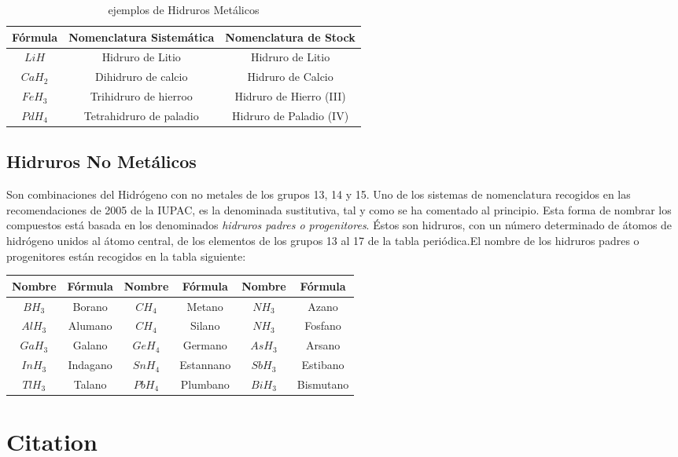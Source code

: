 \documentclass[11pt,fleqn]{book} %
\begin{document}
\begin{table}[h!]
	\centering
	\begin{tabular}{c|cc}
	Fórmula&Nomenclatura Sistemática&Nomenclatura de Stock\\ \hline
	$LiH$&Hidruro de Litio&Hidruro de Litio\\ 
	$CaH_2$&Dihidruro de calcio&Hidruro de Calcio\\
	$FeH_3$&Trihidruro de hierroo&Hidruro de Hierro (III)\\
	$PdH_4$&Tetrahidruro de paladio&Hidruro de Paladio (IV)\\ \hline
	\end{tabular}
	\caption{ejemplos de Hidruros Metálicos}
\end{table}
\subsection{Hidruros No Metálicos}
Son combinaciones del Hidrógeno con no metales de los grupos 13, 14 y 15. Uno de los sistemas de nomenclatura recogidos en las recomendaciones de 2005 de la IUPAC, es la denominada sustitutiva, tal y como se ha comentado al principio. Esta forma de nombrar los compuestos está basada en los denominados \emph{hidruros padres o progenitores}. Éstos son hidruros, con un número determinado de átomos de hidrógeno unidos al átomo central, de los elementos de los grupos 13 al 17 de la tabla periódica.El nombre de los hidruros padres o progenitores están recogidos en la tabla siguiente:
\begin{table}[h!]
	\centering
	\begin{tabular}{|c|c||c|c||c|c|}\hline
		Nombre&Fórmula&Nombre&Fórmula&Nombre&Fórmula\\ \hline
		$BH_3$&Borano&$CH_4$&Metano&$NH_3$&Azano\\
		$AlH_3$&Alumano&$CH_4$&Silano&$NH_3$&Fosfano\\
		$GaH_3$&Galano&$GeH_4$&Germano&$AsH_3$&Arsano\\
		$InH_3$&Indagano&$SnH_4$&Estannano&$SbH_3$&Estibano\\
		$TlH_3$&Talano&$PbH_4$&Plumbano&$BiH_3$&Bismutano\\ \hline
		
	\end{tabular}
\end{table}



\section{Citation}
\end{document}
